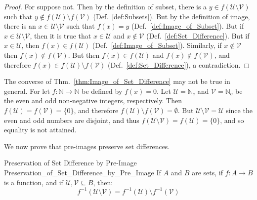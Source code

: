     \begin{proof}
        For suppose not. Then by the definition of subset, there is a
        $y\in{f}(\mathcal{U}\setminus\mathcal{V})$ such that
        $y\notin{f}(\mathcal{U})\setminus{f}(\mathcal{V})$
        (Def.~\ref{def:Subsets}). But by the definition of image, there is an
        $x\in\mathcal{U}\setminus\mathcal{V}$ such that $f(x)=y$
        (Def.~\ref{def:Image_of_Subset}). But if
        $x\in\mathcal{U}\setminus\mathcal{V}$, then it is true that
        $x\in\mathcal{U}$ and $x\notin\mathcal{V}$
        (Def.~\ref{def:Set_Difference}). But if $x\in\mathcal{U}$, then
        $f(x)\in{f}(\mathcal{U})$ (Def.~\ref{def:Image_of_Subset}). Similarly,
        if $x\notin\mathcal{V}$ then $f(x)\notin{f}(\mathcal{V})$. But then
        $f(x)\in{f}(\mathcal{U})$ and $f(x)\notin{f}(\mathcal{V})$, and
        therefore $f(x)\in{f}(\mathcal{U})\setminus{f}(\mathcal{V})$
        (Def.~\ref{def:Set_Difference}), a contradiction.
    \end{proof}
    \begin{example}
        The converse of Thm.~\ref{thm:Image_of_Set_Difference} may not be true
        in general. For let $f:\mathbb{N}\rightarrow\mathbb{N}$ be defined by
        $f(x)=0$. Let $\mathcal{U}=\mathbb{N}_{e}$ and
        $\mathcal{V}=\mathbb{N}_{o}$ be the even and odd non-negative integers,
        respectively. Then $f(\mathcal{U})=f(\mathcal{V})=\{0\}$, and therefore
        $f(\mathcal{U})\setminus{f}(\mathcal{V})=\emptyset$. But
        $\mathcal{U}\setminus\mathcal{V}=\mathcal{U}$ since the even and odd
        numbers are disjoint, and thus
        $f(\mathcal{U}\setminus\mathcal{V})=f(\mathcal{U})=\{0\}$, and so
        equality is not attained.
    \end{example}
    We now prove that pre-images preserve set differences.
    \begin{ftheorem}{Preservation of Set Difference by Pre-Image}
                    {Preservation_of_Set_Difference_by_Pre_Image}
        If $A$ and $B$ are sets, if $f:A\rightarrow B$ is a function, and if
        $\mathcal{U},\mathcal{V}\subseteq{B}$, then:
        \begin{equation*}
            f^{\minus{1}}(\mathcal{U}\setminus\mathcal{V})
            =f^{\minus{1}}(\mathcal{U})\setminus{f}^{\minus{1}}(\mathcal{V})
        \end{equation*}
    \end{ftheorem}
